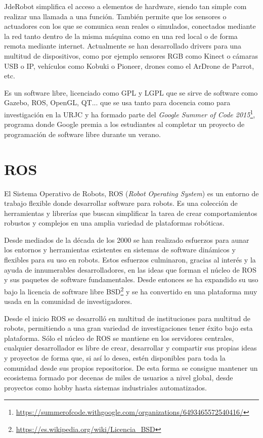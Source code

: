 JdeRobot simplifica el acceso a elementos de hardware, siendo tan simple com realizar una llamada a una función. También permite que los sensores o actuadores con los que se comunica sean reales o simulados, conectados mediante la red tanto dentro de la misma máquina como en una red local o de forma remota mediante internet. Actualmente se han desarrollado drivers para una multitud de dispositivos, como por ejemplo sensores RGB como Kinect o cámaras USB o IP, vehículos como Kobuki o Pioneer, drones como el ArDrone de Parrot, etc.

Es un software libre, licenciado como GPL y LGPL que se sirve de software como Gazebo, ROS, OpenGL, QT... que se usa tanto para docencia como para investigación en la URJC y ha formado parte del \textit{Google Summer of Code 2015}\footnote{\url{https://summerofcode.withgoogle.com/organizations/6493465572540416/}}, programa donde Google premia a los estudiantes al completar un proyecto de programación de software libre durante un verano.


\section{ROS}
\label{sec:plat_ros}

El Sistema Operativo de Robots, ROS\cite{ros} (\textit{Robot Operating System}) es un entorno de trabajo flexible donde desarrollar software para robots. Es una colección de herramientas y librerías que buscan simplificar la tarea de crear comportamientos robustos y complejos en una amplia variedad de plataformas robóticas. 

Desde mediados de la década de los 2000 se han realizado esfuerzos para aunar los entornos y herramientas existentes en sistemas de software dinámicos y flexibles para su uso en robots. Estos esfuerzos culminaron, gracias al interés y la ayuda de innumerables desarrolladores, en las ideas que forman el núcleo de ROS y sus paquetes de software fundamentales. Desde entonces se ha expandido su uso bajo la licencia de software libre BSD\footnote{\url{https://es.wikipedia.org/wiki/Licencia_BSD}} y se ha convertido en una plataforma muy usada en la comunidad de investigadores.

Desde el inicio ROS se desarrolló en multitud de instituciones para multitud de robots, permitiendo a una gran variedad de investigaciones tener éxito bajo esta plataforma. Sólo el núcleo de ROS se mantiene en los servidores centrales, cualquier desarrollador es libre de crear, desarrollar y compartir sus propias ideas y proyectos de forma que, si así lo desea, estén disponibles para toda la comunidad desde sus propios repositorios. De esta forma se consigue mantener un ecosistema formado por decenas de miles de usuarios a nivel global, desde proyectos como hobby hasta sistemas industriales automatizados.

